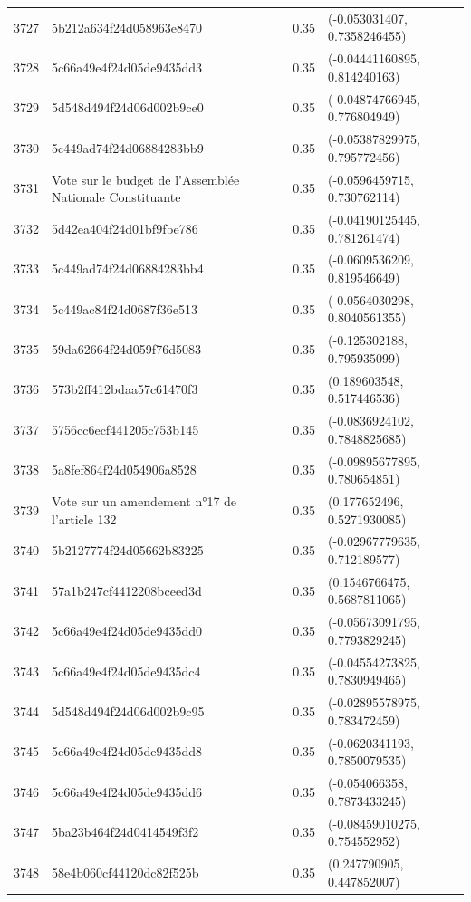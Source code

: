 \begin{table}[ht]
\begin{tabular}{rlrl}
  3727 & 5b212a634f24d058963e8470 & 0.35 & (-0.053031407, 0.7358246455) \\ 
  3728 & 5c66a49e4f24d05de9435dd3 & 0.35 & (-0.04441160895, 0.814240163) \\ 
  3729 & 5d548d494f24d06d002b9ce0 & 0.35 & (-0.04874766945, 0.776804949) \\ 
  3730 & 5c449ad74f24d06884283bb9 & 0.35 & (-0.05387829975, 0.795772456) \\ 
  3731 & Vote sur le budget de l'Assemblée Nationale Constituante & 0.35 & (-0.0596459715, 0.730762114) \\ 
  3732 & 5d42ea404f24d01bf9fbe786 & 0.35 & (-0.04190125445, 0.781261474) \\ 
  3733 & 5c449ad74f24d06884283bb4 & 0.35 & (-0.0609536209, 0.819546649) \\ 
  3734 & 5c449ac84f24d0687f36e513 & 0.35 & (-0.0564030298, 0.8040561355) \\ 
  3735 & 59da62664f24d059f76d5083 & 0.35 & (-0.125302188, 0.795935099) \\ 
  3736 & 573b2ff412bdaa57c61470f3 & 0.35 & (0.189603548, 0.517446536) \\ 
  3737 & 5756cc6ecf441205c753b145 & 0.35 & (-0.0836924102, 0.7848825685) \\ 
  3738 & 5a8fef864f24d054906a8528 & 0.35 & (-0.09895677895, 0.780654851) \\ 
  3739 & Vote sur un amendement n°17 de l'article 132 & 0.35 & (0.177652496, 0.5271930085) \\ 
  3740 & 5b2127774f24d05662b83225 & 0.35 & (-0.02967779635, 0.712189577) \\ 
  3741 & 57a1b247cf4412208bceed3d & 0.35 & (0.1546766475, 0.5687811065) \\ 
  3742 & 5c66a49e4f24d05de9435dd0 & 0.35 & (-0.05673091795, 0.7793829245) \\ 
  3743 & 5c66a49e4f24d05de9435dc4 & 0.35 & (-0.04554273825, 0.7830949465) \\ 
  3744 & 5d548d494f24d06d002b9c95 & 0.35 & (-0.02895578975, 0.783472459) \\ 
  3745 & 5c66a49e4f24d05de9435dd8 & 0.35 & (-0.0620341193, 0.7850079535) \\ 
  3746 & 5c66a49e4f24d05de9435dd6 & 0.35 & (-0.054066358, 0.7873433245) \\ 
  3747 & 5ba23b464f24d0414549f3f2 & 0.35 & (-0.08459010275, 0.754552952) \\ 
  3748 & 58e4b060cf44120dc82f525b & 0.35 & (0.247790905, 0.447852007) \\ 

\end{tabular}
\end{table}
